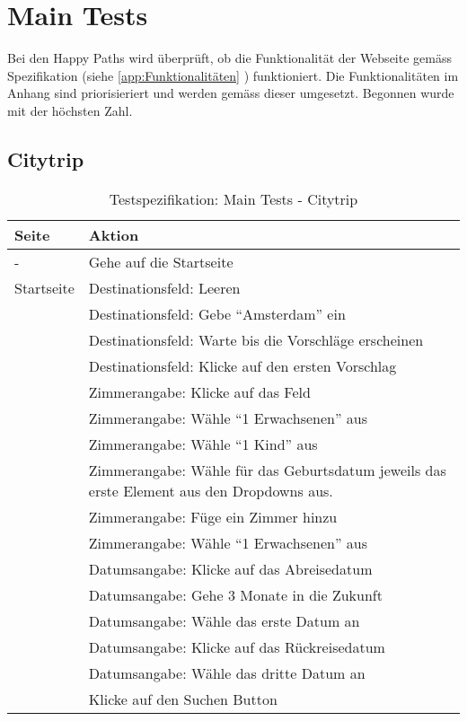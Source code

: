 \section{Main Tests}
Bei den Happy Paths wird überprüft, ob die Funktionalität der Webseite gemäss Spezifikation (siehe \cref{app:Funktionalitäten} ) funktioniert. Die Funktionalitäten im Anhang sind priorisieriert und werden gemäss dieser umgesetzt. Begonnen wurde mit der höchsten Zahl.

\subsection{Citytrip}

\begin{table}[H] 
	\caption{Testspezifikation: Main Tests - Citytrip}
	\centering
		
	\begin{tabularx}{0.9\textwidth}{ | l | X | } 
		\hline 
		\textbf{Seite} & \textbf{Aktion} \\ \hline 
		\multirow{1}{*}{-} & Gehe auf die Startseite \\ \hline
		\multirow{1}{*}{Startseite} & Destinationsfeld: Leeren \\ \cline{2-2}
		& Destinationsfeld: Gebe "`Amsterdam"' ein \\ \cline{2-2}
		& Destinationsfeld: Warte bis die Vorschläge erscheinen \\ \cline{2-2}
		& Destinationsfeld: Klicke auf den ersten Vorschlag \\ \cline{2-2}
		& Zimmerangabe: Klicke auf das Feld \\ \cline{2-2}
		& Zimmerangabe: Wähle "`1 Erwachsenen"' aus \\ \cline{2-2}
		& Zimmerangabe: Wähle "`1 Kind"' aus \\ \cline{2-2}
		& Zimmerangabe: Wähle für das Geburtsdatum jeweils das erste Element aus den Dropdowns aus.  \\ \cline{2-2}
		& Zimmerangabe: Füge ein Zimmer hinzu \\ \cline{2-2}
		& Zimmerangabe: Wähle "`1 Erwachsenen"' aus \\ \cline{2-2}
		& Datumsangabe: Klicke auf das Abreisedatum \\ \cline{2-2}
		& Datumsangabe: Gehe 3 Monate in die Zukunft \\ \cline{2-2}
		& Datumsangabe: Wähle das erste Datum an \\ \cline{2-2}
		& Datumsangabe: Klicke auf das Rückreisedatum \\ \cline{2-2}
		& Datumsangabe: Wähle das dritte Datum an \\ \cline{2-2}
		& Klicke auf den Suchen Button \\ \hline
		

\end{tabularx}
\end{table}
